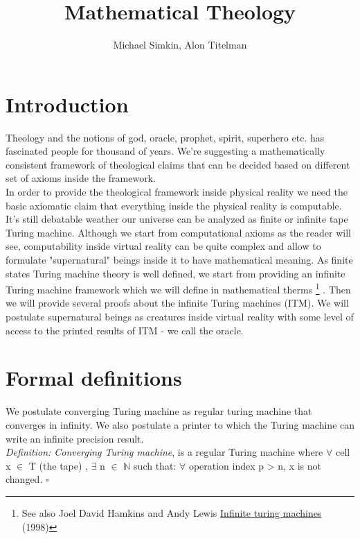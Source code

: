 \documentclass{article}
\title{\Huge Mathematical Theology}
\author{Michael Simkin, Alon Titelman}
\begin{document}
	\maketitle
	\section{Introduction}
	Theology and the notions of god, oracle, prophet, spirit, superhero etc. has fascinated people for thousand of years. We're suggesting a mathematically consistent framework of theological claims that can be decided based on different set of axioms inside the framework.\\
	
	In order to provide the theological framework inside physical reality we need the basic axiomatic claim that everything inside the physical reality is computable. It's still debatable weather our universe can be analyzed as finite or infinite tape Turing machine. Although we start from computational axioms as the reader will see, computability inside virtual reality can be quite complex and allow to formulate "supernatural" beings inside it to have mathematical meaning. As finite states Turing machine theory is well defined, we start from providing an infinite Turing machine framework which we will define in mathematical therms \footnote{ See also Joel David Hamkins and Andy Lewis \href{http://www.sharelatex.com}{Infinite turing machines} (1998) } . Then we will provide several proofs about the infinite Turing machines (ITM). We will postulate supernatural beings as creatures inside virtual reality with some level of access to the printed results of ITM - we call the oracle. 
	\section{Formal definitions}
	
	We postulate converging Turing machine as regular turing machine that converges in infinity. We also postulate a printer to which the Turing machine can write an infinite precision result. \\

	\textit{Definition: Converging Turing machine}, is a regular Turing machine where $\forall$ cell x $\in$ T (the tape) , $\exists$ n $\in$ $\mathbb{N}$ such that: $\forall$ operation index p > n, x is not changed. $\square$ \\
	
\end{document}
